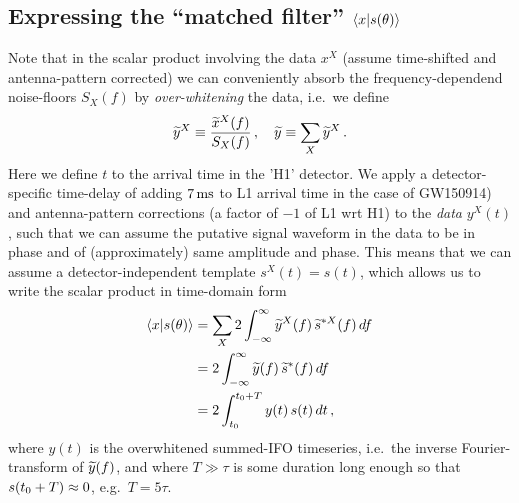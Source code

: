\documentclass[aps,prd,onecolumn,notitlepage,nofootinbib,superscriptaddress,altaffilletter,floatfix]{revtex4-1}
\begin{document}
\subsection{Expressing the ``matched filter'' $\langle x|s(\theta)\rangle$}
\label{sec:computing-scalarxs}

Note that in the scalar product involving the data $x^X$ (assume time-shifted and antenna-pattern corrected) we can conveniently absorb the
frequency-dependend noise-floors $S_X(f)$ by \emph{over-whitening} the data, i.e.\ we define
\begin{equation}
  \label{eq:12}
  \widetilde{y}^X \equiv \frac{\widetilde{x}^X(f)}{S_X(f)}\,,\quad
  \widetilde{y} \equiv \sum_X \widetilde{y}^X\,.
\end{equation}
Here we define $t$ to the arrival time in the 'H1' detector.
We apply a detector-specific time-delay of adding $7\,\mathrm{ms}$ to L1 arrival time in the case of GW150914) and
antenna-pattern corrections (a factor of $-1$ of L1 wrt H1) to the \emph{data} $y^X(t)$, such that we can assume the putative signal waveform in the
data to be in phase and of (approximately) same amplitude and phase. This means that we can assume a detector-independent template $s^X(t) = s(t)$,
which allows us to write the scalar product in time-domain form
\begin{align}
  \label{eq:13}
  \langle x|s(\theta)\rangle &= \sum_X 2\int_{-\infty}^{\infty} \widetilde{y}^X(f)\,\widetilde{s}^{*X}(f)\,df \\
  &= 2\int_{-\infty}^{\infty} \widetilde{y}(f)\,\widetilde{s}^{*}(f)\,df \\
  &=  2\int_{t_0}^{t_0 + T} y(t)\,s(t)\,dt\,,
\end{align}
where $y(t)$ is the overwhitened summed-IFO timeseries, i.e.\ the inverse Fourier-transform of $\widetilde{y}(f)$, and
where $T \gg \tau$ is some duration long enough so that $s(t_0+T)\approx0$, e.g.\ $T=5\tau$.
\end{document}
